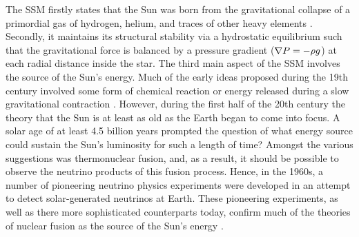 The SSM firstly states that the Sun was born from the gravitational collapse of a primordial gas of hydrogen, helium, and traces of other heavy elements \citep{sackmann1993}. Secondly, it maintains its structural stability via a hydrostatic equilibrium such that the gravitational force is balanced by a pressure gradient (${\bf \nabla }{P}=-\rho g$) at each radial distance inside the star. The third main aspect of the SSM involves the source of the Sun's energy. Much of the early ideas proposed during the 19th century involved some form of chemical reaction or energy released during a slow gravitational contraction \citep{shipley2001}. However, during the first half of the 20th century the theory that the Sun is at least as old as the Earth began to come into focus. A solar age of at least 4.5 billion years prompted the question of what energy source could sustain the Sun's luminosity for such a length of time? Amongst the various suggestions was thermonuclear fusion, and, as a result, it should be possible to observe the neutrino products of this fusion process. Hence, in the 1960s, a number of pioneering neutrino physics experiments were developed in an attempt to detect solar-generated neutrinos at Earth. These pioneering experiments, as well as there more sophisticated counterparts today, confirm much of the theories of nuclear fusion as the source of the Sun's energy \citep{davis1968}.

